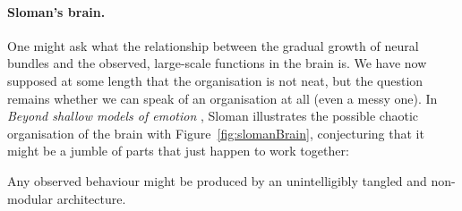 \paragraph{Sloman's brain.} One might ask what the relationship between the gradual growth of neural bundles and the observed, large-scale functions in the brain is. We have now supposed at some length that the organisation is not neat, but the question remains whether we can speak of an organisation at all (even a messy one). In {\em Beyond shallow models of emotion} \cite[p.\ 8]{sloman2000}, Sloman illustrates the possible chaotic organisation of the brain with Figure~\ref{fig:slomanBrain}, conjecturing that it might be a jumble of parts that just happen to work together:

\begin{emquote}
	Any observed behaviour might be produced by an unintelligibly tangled and non-modular architecture. 
\end{emquote}

